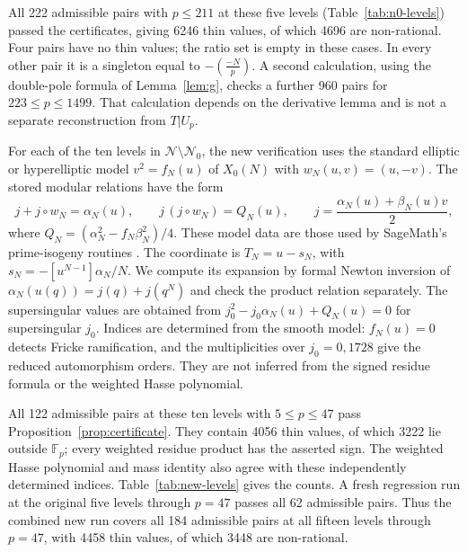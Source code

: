 \documentclass[11pt,a4paper]{article}
\numberwithin{equation}{section}
\theoremstyle{definition}
\theoremstyle{remark}
\newcommand{\Fp}{\mathbb F_p}
\begin{document}
All 222 admissible pairs with $p\le211$ at these five levels
(Table~\ref{tab:n0-levels}) passed the certificates, giving 6246 thin
values, of which 4696 are non-rational. Four pairs have no thin values; the ratio
set is empty in these cases. In every other pair it is a singleton equal to
$-\left(\frac{-N}{p}\right)$. A second calculation, using the double-pole formula
of Lemma~\ref{lem:g}, checks a further 960 pairs for $223\le p\le1499$.
That calculation depends on the derivative lemma and is not a separate
reconstruction from $T|U_p$.

For each of the ten levels in $\mathcal N\setminus\mathcal N_0$,
the new verification uses the standard elliptic or hyperelliptic model
$v^2=f_N(u)$ of $X_0(N)$ with $w_N(u,v)=(u,-v)$.
The stored modular relations have the form
\[
j+j\circ w_N=\alpha_N(u),\qquad
j\,(j\circ w_N)=Q_N(u),\qquad
j=\frac{\alpha_N(u)+\beta_N(u)v}{2},
\]
where $Q_N=(\alpha_N^2-f_N\beta_N^2)/4$.
These model data are those used by SageMath's prime-isogeny routines
\citep{SageModels}. The coordinate is $T_N=u-s_N$, with
$s_N=-[u^{N-1}]\alpha_N/N$.
We compute its expansion by formal Newton inversion of
$\alpha_N(u(q))=j(q)+j(q^N)$ and check the product relation separately.
The supersingular values are obtained from
$j_0^2-j_0\alpha_N(u)+Q_N(u)=0$ for supersingular $j_0$.
Indices are determined from the smooth model: $f_N(u)=0$ detects
Fricke ramification, and the multiplicities over $j_0=0,1728$
give the reduced automorphism orders. They are not inferred from
the signed residue formula or the weighted Hasse polynomial.

All 122 admissible pairs at these ten levels with $5\le p\le47$
pass Proposition~\ref{prop:certificate}. They contain 4056 thin values,
of which 3222 lie outside $\Fp$; every weighted residue product has
the asserted sign. The weighted Hasse polynomial and mass identity
also agree with these independently determined indices.
Table~\ref{tab:new-levels} gives the counts.
A fresh regression run at the original five levels through $p=47$
passes all 62 admissible pairs. Thus the combined new run covers all
184 admissible pairs at all fifteen levels through $p=47$, with 4458
thin values, of which 3448 are non-rational.
\end{document}
